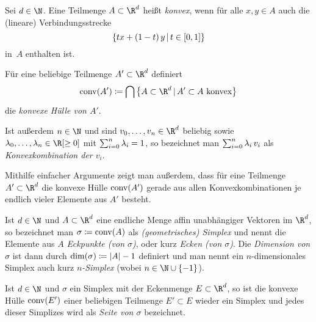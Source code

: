 \begin{thDef}
    Sei $d\in\N$. Eine Teilmenge $A\subset\R^d$ heißt \emph{konvex}, wenn
    für alle $x,y\in A$ auch die (lineare) Verbindungsstrecke
    \[ \{ tx + (1-t)\,y \Mid t\in[0,1] \} \]
    in~$A$ enthalten ist.

    \newpage
    \noindent
    Für eine beliebige Teilmenge $A'\subset\R^d$ definiert
    \[ \conv(A') \defeq 
        \bigcap \,\bigl\{ A\subset\R^d \Mid A'\subset A\text{ konvex} \bigr\}
    \]
    die \emph{konvexe Hülle von $A'$}.
    
    \noindent
    Ist außerdem $n\in\N$ und sind $v_0,\ldots,v_n\in\R^d$ beliebig sowie
    $\lambda_0,\ldots,\lambda_n\in\R[\geq0]$ mit $\sum_{i=0}^n\lambda_i = 1$, so
    bezeichnet man $\sum_{i=0}^n \lambda_i\,v_i$ als \emph{Konvexkombination der
    $v_i$}.
\end{thDef}

\begin{thBemerkung} \label{gsc:convexhullviaconvexcombinations}
    Mithilfe einfacher Argumente zeigt man außerdem, dass für eine Teilmenge
    $A'\subset\R^d$ die konvexe Hülle $\operatorname{conv}(A')$ gerade aus allen 
    Konvexkombinationen je endlich vieler Elemente aus $A'$ besteht.
\end{thBemerkung}


\begin{thDef}
    \label{gsc:def:simplex}
    Ist $d\in\N$ und $A\subset\R^d$ eine endliche Menge affin unabhängiger
    Vektoren im $\R^d$, so bezeichnet man $\sigma \coloneqq \operatorname{conv}(A)$ als
    \emph{(geometrisches) Simplex} und nennt die Elemente aus $A$
    \emph{Eckpunkte (von $\sigma$)}, oder kurz \emph{Ecken (von $\sigma$)}. Die
    \emph{Dimension von $\sigma$} ist dann durch $\dim(\sigma) \coloneqq \lvert A\rvert-1$
    definiert und man nennt ein $n$-dimensionales Simplex auch kurz
    \emph{$n$-Simplex} (wobei $n\in\N\cup\{-1\}$).
\end{thDef}

\begin{thDef}
    Ist $d\in\N$ und $\sigma$ ein Simplex mit der Eckenmenge
    $E \subset\R^d$, so ist die konvexe Hülle $\operatorname{conv}(E')$ einer beliebigen 
    Teilmenge $E'\subset E$ wieder ein Simplex und jedes dieser Simplizes wird
    als \emph{Seite von $\sigma$} bezeichnet.
\end{thDef}

